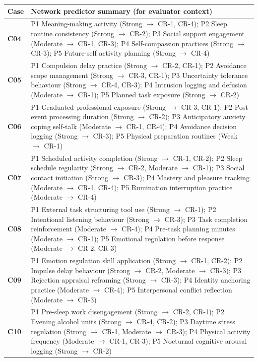\documentclass[11pt,a4paper]{article}
\renewcommand{\arraystretch}{1.30}
\begin{document}
\small\renewcommand{\arraystretch}{1.35}
\begin{tabular}{@{}>{\bfseries\color{PrimaryBlue}}p{}p{}@{}}
\toprule
\textbf{Case} & \textbf{Network predictor summary (for evaluator context)} \\
\midrule
C04 & P1 Meaning-making activity (Strong $\to$ CR-1, CR-4); P2 Sleep routine consistency (Strong $\to$ CR-2); P3 Social support engagement (Moderate $\to$ CR-1, CR-3); P4 Self-compassion practices (Strong $\to$ CR-3); P5 Future-self activity planning (Strong $\to$ CR-4) \\[0.3em]
C05 & P1 Compulsion delay practice (Strong $\to$ CR-2, CR-1); P2 Avoidance scope management (Strong $\to$ CR-3, CR-1); P3 Uncertainty tolerance behaviour (Strong $\to$ CR-4, CR-3); P4 Intrusion logging and defusion (Moderate $\to$ CR-1); P5 Planned task exposure (Strong $\to$ CR-2) \\[0.3em]
C06 & P1 Graduated professional exposure (Strong $\to$ CR-3, CR-1); P2 Post-event processing duration (Strong $\to$ CR-2); P3 Anticipatory anxiety coping self-talk (Moderate $\to$ CR-1, CR-4); P4 Avoidance decision logging (Strong $\to$ CR-3); P5 Physical preparation routines (Weak $\to$ CR-1) \\[0.3em]
C07 & P1 Scheduled activity completion (Strong $\to$ CR-1, CR-2); P2 Sleep schedule regularity (Strong $\to$ CR-2, Moderate $\to$ CR-1); P3 Social contact initiation (Strong $\to$ CR-3); P4 Mastery and pleasure tracking (Moderate $\to$ CR-1, CR-4); P5 Rumination interruption practice (Moderate $\to$ CR-4) \\[0.3em]
C08 & P1 External task structuring tool use (Strong $\to$ CR-1); P2 Intentional listening behaviour (Strong $\to$ CR-3); P3 Task completion reinforcement (Moderate $\to$ CR-4); P4 Pre-task planning minutes (Moderate $\to$ CR-1); P5 Emotional regulation before response (Moderate $\to$ CR-2, CR-3) \\[0.3em]
C09 & P1 Emotion regulation skill application (Strong $\to$ CR-1, CR-2); P2 Impulse delay behaviour (Strong $\to$ CR-2, Moderate $\to$ CR-3); P3 Rejection appraisal reframing (Strong $\to$ CR-3); P4 Identity anchoring practice (Moderate $\to$ CR-4); P5 Interpersonal conflict reflection (Moderate $\to$ CR-3) \\[0.3em]
C10 & P1 Pre-sleep work disengagement (Strong $\to$ CR-2, CR-1); P2 Evening alcohol units (Strong $\to$ CR-4, CR-2); P3 Daytime stress regulation (Strong $\to$ CR-1, Moderate $\to$ CR-3); P4 Physical activity frequency (Moderate $\to$ CR-1, CR-3); P5 Nocturnal cognitive arousal logging (Strong $\to$ CR-2) \\
\bottomrule
\end{tabular}
\end{document}
